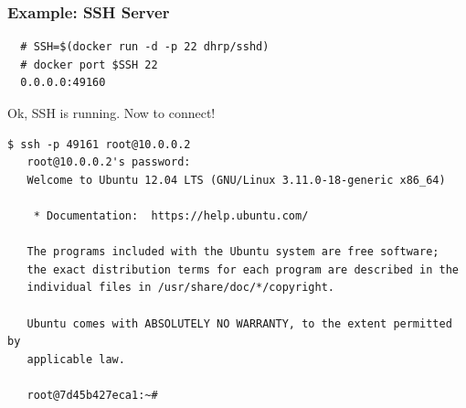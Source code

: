 \documentclass[xcolor=dvipsnames]{beamer}
\begin{document}
\begin{frame}[fragile]
  \frametitle{Example: SSH Server}
  \begin{lstlisting}
  # SSH=$(docker run -d -p 22 dhrp/sshd)
  # docker port $SSH 22
  0.0.0.0:49160
  \end{lstlisting}

  Ok, SSH is running. Now to connect!

\begin{lstlisting}[basicstyle=\tiny]
   $ ssh -p 49161 root@10.0.0.2
   root@10.0.0.2's password:
   Welcome to Ubuntu 12.04 LTS (GNU/Linux 3.11.0-18-generic x86_64)

    * Documentation:  https://help.ubuntu.com/

   The programs included with the Ubuntu system are free software;
   the exact distribution terms for each program are described in the
   individual files in /usr/share/doc/*/copyright.

   Ubuntu comes with ABSOLUTELY NO WARRANTY, to the extent permitted by
   applicable law.

   root@7d45b427eca1:~#
  \end{lstlisting}
  
\end{frame}
\end{document}
